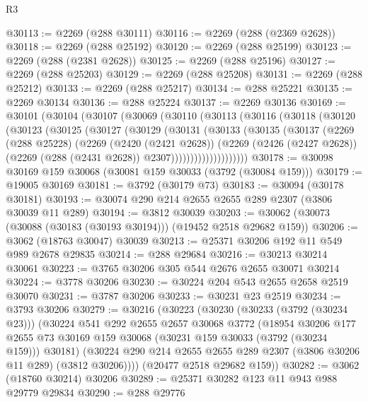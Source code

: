 \begin{lexlean}{R3}
\begin{coremodule}
@30113 := @2269 (@288 @30111)
@30116 := @2269 (@288 (@2369 @2628))
@30118 := @2269 (@288 @25192)
@30120 := @2269 (@288 @25199)
@30123 := @2269 (@288 (@2381 @2628))
@30125 := @2269 (@288 @25196)
@30127 := @2269 (@288 @25203)
@30129 := @2269 (@288 @25208)
@30131 := @2269 (@288 @25212)
@30133 := @2269 (@288 @25217)
@30134 := @288 @25221
@30135 := @2269 @30134
@30136 := @288 @25224
@30137 := @2269 @30136
@30169 := @30101
    (@30104
      (@30107
        (@30069
          (@30110
            (@30113
              (@30116
                (@30118
                  (@30120
                    (@30123
                      (@30125
                        (@30127
                          (@30129
                            (@30131
                              (@30133
                                (@30135
                                  (@30137
                                    (@2269
                                      (@288 @25228)
                                      (@2269
                                        (@2420 (@2421 @2628))
                                        (@2269
                                          (@2426 (@2427 @2628))
                                          (@2269 (@288 (@2431 @2628)) @2307))))))))))))))))))))
@30178 := @30098 @30169 @159 @30068 (@30081 @159 @30033 (@3792 (@30084 @159)))
@30179 := @19005 @30169
@30181 := @3792 (@30179 @73)
@30183 := @30094 (@30178 @30181)
@30193 := @30074 @290 @214 @2655 @2655 @289 @2307 (@3806 @30039 @11 @289)
@30194 := @3812 @30039
@30203 := @30062 (@30073 (@30088 (@30183 (@30193 @30194))) (@19452 @2518 @29682 @159))
@30206 := @3062 (@18763 @30047) @30039
@30213 := @25371 @30206 @192 @11 @549 @989 @2678 @29835
@30214 := @288 @29684
@30216 := @30213 @30214 @30061
@30223 := @3765 @30206 @305 @544 @2676 @2655 @30071 @30214
@30224 := @3778 @30206
@30230 := @30224 @204 @543 @2655 @2658 @2519 @30070
@30231 := @3787 @30206
@30233 := @30231 @23 @2519
@30234 := @3793 @30206
@30279 := @30216
    (@30223
      (@30230
        (@30233 (@3792 (@30234 @23)))
        (@30224
          @541
          @292
          @2655
          @2657
          @30068
          @3772
          (@18954
            @30206
            @177
            @2655
            @73
            @30169
            @159
            @30068
            (@30231 @159 @30033 (@3792 (@30234 @159)))
            @30181)
          (@30224 @290 @214 @2655 @2655 @289 @2307 (@3806 @30206 @11 @289) (@3812 @30206))))
      (@20477 @2518 @29682 @159))
@30282 := @3062 (@18760 @30214) @30206
@30289 := @25371 @30282 @123 @11 @943 @988 @29779 @29834
@30290 := @288 @29776

\end{coremodule}
\end{lexlean}
